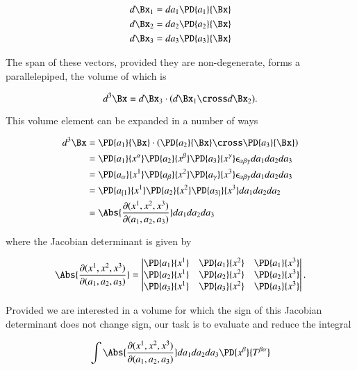 \begin{align}\label{eqn:relativisticElectrodynamicsPS6:380}
d\Bx_1 &= da_1 \PD{a_1}{\Bx} \\
d\Bx_2 &= da_2 \PD{a_2}{\Bx} \\
d\Bx_3 &= da_3 \PD{a_3}{\Bx}
\end{align}

The span of these vectors, provided they are non-degenerate, forms a parallelepiped, the volume of which is

\begin{equation}\label{eqn:relativisticElectrodynamicsPS6:400}
d^3\Bx = d\Bx_3 \cdot (d\Bx_1 \cross d\Bx_2).
\end{equation}

This volume element can be expanded in a number of ways

\begin{align*}
d^3\Bx 
&= \PD{a_1}{\Bx} \cdot \left( \PD{a_2}{\Bx} \cross \PD{a_3}{\Bx} \right) \\
&= 
\PD{a_1}{x^\alpha} 
\PD{a_2}{x^\beta} 
\PD{a_3}{x^\gamma} 
\epsilon_{\alpha \beta \gamma} 
da_1 da_2 da_3 \\
&= 
\PD{a_\alpha}{x^1} 
\PD{a_\beta}{x^2} 
\PD{a_\gamma}{x^3} 
\epsilon_{\alpha \beta \gamma} 
da_1 da_2 da_3 \\
&= 
\PD{a_{[1}}{x^1} 
\PD{a_{2}}{x^2} 
\PD{a_{3]}}{x^3} 
da_1 da_2 da_2 \\
&= 
\Abs{ \frac{\partial(x^1, x^2, x^3)}{\partial (a_1, a_2, a_3)}}
da_1 da_2 da_3 \\
\end{align*}

where the Jacobian determinant is given by

\begin{equation}\label{eqn:relativisticElectrodynamicsPS6:420}
\Abs{ \frac{\partial(x^1, x^2, x^3)}{\partial (a_1, a_2, a_3)}}
= 
\begin{vmatrix}
 \PD{a_1}{x^1} & \PD{a_1}{x^2} & \PD{a_1}{x^3} \\
 \PD{a_2}{x^1} & \PD{a_2}{x^2} & \PD{a_2}{x^3} \\
 \PD{a_3}{x^1} & \PD{a_3}{x^2} & \PD{a_3}{x^3}
\end{vmatrix}.
\end{equation}

Provided we are interested in a volume for which the sign of this Jacobian determinant does not change sign, our task is to evaluate and reduce the integral 

\begin{equation}\label{eqn:relativisticElectrodynamicsPS6:620}
\int 
\Abs{ \frac{\partial(x^1, x^2, x^3)}{\partial (a_1, a_2, a_3)}}
da_1 da_2 da_3 
\PD{x^\beta}{T^{\beta \alpha}}
\end{equation}

